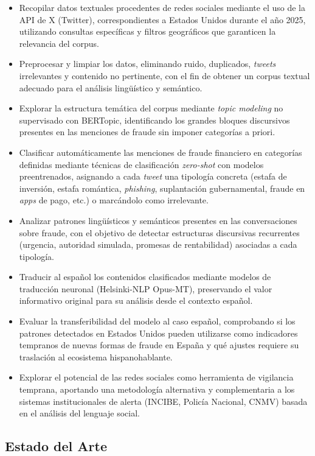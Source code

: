 \begin{itemize}
    \item Recopilar datos textuales procedentes de redes sociales mediante el uso de la API de X (Twitter), correspondientes a Estados Unidos durante el año 2025, utilizando consultas específicas y filtros geográficos que garanticen la relevancia del corpus.
    \item Preprocesar y limpiar los datos, eliminando ruido, duplicados, \textit{tweets} irrelevantes y contenido no pertinente, con el fin de obtener un corpus textual adecuado para el análisis lingüístico y semántico.
    \item Explorar la estructura temática del corpus mediante \textit{topic modeling} no supervisado con BERTopic, identificando los grandes bloques discursivos presentes en las menciones de fraude sin imponer categorías a priori.
    \item Clasificar automáticamente las menciones de fraude financiero en categorías definidas mediante técnicas de clasificación \textit{zero-shot} con modelos preentrenados, asignando a cada \textit{tweet} una tipología concreta (estafa de inversión, estafa romántica, \textit{phishing}, suplantación gubernamental, fraude en \textit{apps} de pago, etc.) o marcándolo como irrelevante.
    \item Analizar patrones lingüísticos y semánticos presentes en las conversaciones sobre fraude, con el objetivo de detectar estructuras discursivas recurrentes (urgencia, autoridad simulada, promesas de rentabilidad) asociadas a cada tipología.
    \item Traducir al español los contenidos clasificados mediante modelos de traducción neuronal (Helsinki-NLP Opus-MT), preservando el valor informativo original para su análisis desde el contexto español.
    \item Evaluar la transferibilidad del modelo al caso español, comprobando si los patrones detectados en Estados Unidos pueden utilizarse como indicadores tempranos de nuevas formas de fraude en España y qué ajustes requiere su traslación al ecosistema hispanohablante.
    \item Explorar el potencial de las redes sociales como herramienta de vigilancia temprana, aportando una metodología alternativa y complementaria a los sistemas institucionales de alerta (INCIBE, Policía Nacional, CNMV) basada en el análisis del lenguaje social.
\end{itemize}

\subsection{Estado del Arte}

